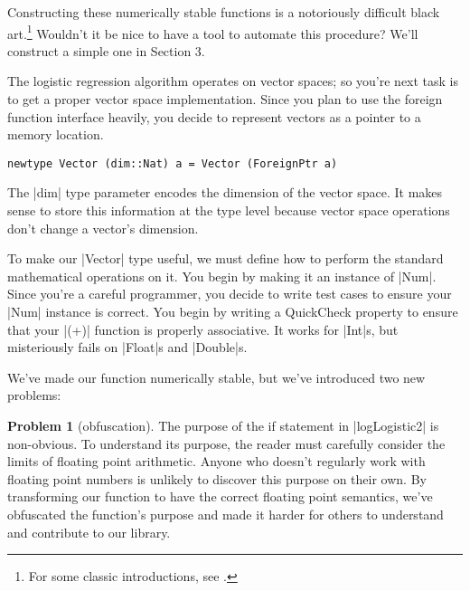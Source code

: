 \documentclass[preprint]{sigplanconf}
\theoremstyle{definition}
\newtheorem{problem}{Problem}
\begin{document}
Constructing these numerically stable functions is a notoriously difficult black art.\footnote{
For some classic introductions, see \cite{goldberg1991,higham2002,hamming2012}.
}
Wouldn't it be nice to have a tool to automate this procedure?
We'll construct a simple one in Section 3.

The logistic regression algorithm operates on vector spaces;
so you're next task is to get a proper vector space implementation.
Since you plan to use the foreign function interface heavily,
you decide to represent vectors as a pointer to a memory location.
\begin{lstlisting}
newtype Vector (dim::Nat) a = Vector (ForeignPtr a)
\end{lstlisting}
The |dim| type parameter encodes the dimension of the vector space.
It makes sense to store this information at the type level because vector space operations don't change a vector's dimension.

To make our |Vector| type useful,
we must define how to perform the standard mathematical operations on it.
You begin by making it an instance of |Num|.
Since you're a careful programmer, you decide to write test cases to ensure your |Num| instance is correct.
You begin by writing a QuickCheck property to ensure that your |(+)| function is properly associative.
It works for |Int|s, but misteriously fails on |Float|s and |Double|s.

\newpage

We've made our function numerically stable, but we've introduced two new problems:

\begin{problem}[obfuscation]
The purpose of the if statement in |logLogistic2| is non-obvious.
To understand its purpose,
the reader must carefully consider the limits of floating point arithmetic.
Anyone who doesn't regularly work with floating point numbers is unlikely to discover this purpose on their own.
By transforming our function to have the correct floating point semantics,
we've obfuscated the function's purpose and made it harder for others to understand and contribute to our library.
\end{problem}
\end{document}
